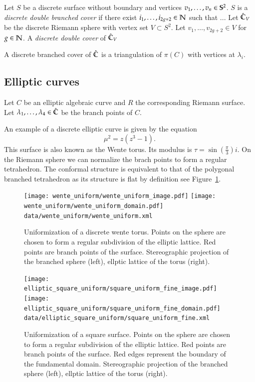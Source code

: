 \documentclass[Thesis.tex]{subfiles}
\begin{document}
\begin{definition}
Let $S$ be a discrete surface without boundary and vertices $v_1,\ldots,v_n\in\S^2$. $S$ is a \emph{discrete double branched cover} if there exist $i_1,\ldots, i_{2g+2}\in \N$ such that ... 
Let $\Chat_V$ be the discrete Riemann sphere with vertex set $V\subset S^2$. Let $v_1,
\ldots,v_{2g+2} \in V$ for $g\in \N$. A \emph{discrete double cover} of $\Chat_V$ 
\end{definition}

A discrete branched cover of $\Chat$ is a triangulation of $\pi(C)$ with vertices at $\lambda_i$.


\subsection{Elliptic curves}

Let $C$ be an elliptic algebraic curve and $R$ the corresponding Riemann surface. Let $\lambda_1, \ldots, \lambda_4 \in \Chat$ be the branch points of $C$. 

\begin{example}
\label{ex:wente_elliptic}
An example of a discrete elliptic curve is given by the equation
\begin{equation}
	\mu^2=z(z^3-1).
\end{equation}
This surface is also known as the Wente torus. Its modulus is $\tau=\sin(\frac{\pi}{3})i$. On the Riemann sphere
we can normalize the brach points to form a regular tetrahedron. The conformal structure is equivalent to that of 
the polygonal branched tetrahedron as its structure is flat by definition see Figure~\ref{fig:wente_elliptic}.
\end{example}

\begin{figure}
	\centering
	\texttt{[image: wente\_uniform/wente\_uniform\_image.pdf]}
	\texttt{[image: wente\_uniform/wente\_uniform\_domain.pdf]}
	{\scriptsize\tt data/wente\_uniform/wente\_uniform.xml}
	\caption{Uniformization of a discrete wente torus. Points on the sphere are chosen to 
form a regular subdivision of the elliptic lattice. Red points are branch points of the surface.
Stereographic projection of the branched sphere (left), ellptic lattice of the torus (right).}
	\label{fig:wente_elliptic}
\end{figure}

\begin{figure}
	\centering
	\texttt{[image: elliptic\_square\_uniform/square\_uniform\_fine\_image.pdf]}
	\texttt{[image: elliptic\_square\_uniform/square\_uniform\_fine\_domain.pdf]}
	{\scriptsize\tt data/elliptic\_square\_uniform/square\_uniform\_fine.xml}
	\caption{Uniformization of a square surface. Points on the sphere are chosen to form a 
regular subdivision of the elliptic lattice. Red points are branch points of the surface. Red 
edges represent the boundary of the fundamental domain. Stereographic projection of the 
branched sphere (left), ellptic lattice of the torus (right).}
	\label{fig:square_elliptic}
\end{figure}	
\end{document}
